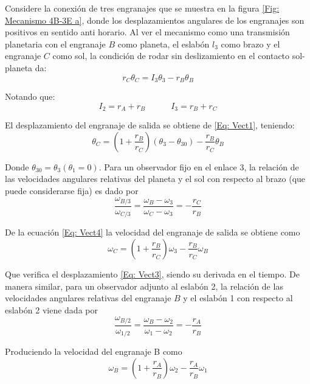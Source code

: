 \documentclass[12pt, final]{extarticle}
\begin{document}
Considere la conexión de tres engranajes que se muestra en la figura \ref{Fig: Mecanismo 4B-3E a}, donde los desplazamientos angulares de los engranajes son positivos en sentido anti horario. Al ver el mecanismo como una transmisión planetaria con el engranaje $B$ como planeta, el eslabón $l_3$ como brazo y el engranaje $C$ como sol, la condición de rodar sin deslizamiento en el contacto sol-planeta da:
\begin{equation}
   r_C\theta_C=I_3\theta_3-r_B\theta_B
   \label{Eq: Vect1}
\end{equation}

Notando que:
\begin{equation}
   I_2=r_A+r_B  \quad\quad\quad I_3=r_B+r_C
   \label{Eq: Vect2}
\end{equation}

El desplazamiento del engranaje de salida se obtiene de \eqref{Eq: Vect1}, teniendo:
\begin{equation}
   \theta_C=(1+\frac{r_B}{r_C})(\theta_3-\theta_{30})-\frac{r_B}{r_C}\theta_B 
   \label{Eq: Vect3}
\end{equation}

Donde $\theta_{30}=\theta_3(\theta_1=0)$. Para un observador fijo en el enlace 3, la relación de las velocidades angulares relativas del planeta y el sol con respecto al brazo (que puede considerarse fija) es dado por
\begin{equation}
   \frac{\omega_{B/3}}{\omega_{C/3}}=\frac{\omega_B-\omega_3}{\omega_C-\omega_3}=-\frac{r_C}{r_B}
    \label{Eq: Vect4}
\end{equation}

De la ecuación \eqref{Eq: Vect4} la velocidad del engranaje de salida se obtiene como
\begin{equation}
   \omega_C=(1+\frac{r_B}{r_C})\omega_3-\frac{r_B}{r_C}\omega_B
   \label{Eq: Vect5}
\end{equation}

Que verifica el desplazamiento \eqref{Eq: Vect3}, siendo su derivada en el tiempo.
De manera similar, para un observador adjunto al eslabón 2, la relación de las velocidades angulares relativas del engranaje $B$ y el eslabón 1 con respecto al eslabón 2 viene dada por
\begin{equation}
   \frac{\omega_{B/2}}{\omega_{1/2}}=\frac{\omega_B-\omega_2}{\omega_1-\omega_2}=-\frac{r_A}{r_B}
\end{equation}

Produciendo la velocidad del engranaje B como
\begin{equation}
   \omega_B=(1+\frac{r_A}{r_B})\omega_2-\frac{r_A}{r_B}\omega_1
   \label{Eq: Vect7}
\end{equation}
\end{document}
